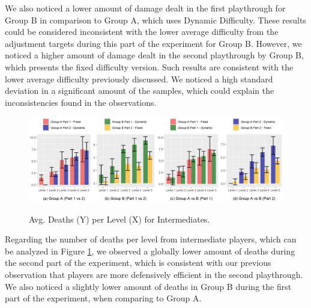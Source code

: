 We also noticed a lower amount of damage dealt in the first playthrough for Group B in comparison to Group A, which uses Dynamic Difficulty. These results could be considered inconsistent with the lower average difficulty from the adjustment targets during this part of the experiment for Group B. However, we noticed a higher amount of damage dealt in the second playthrough by Group B, which presents the fixed difficulty version. Such results are consistent with the lower average difficulty previously discussed. We noticed a high standard deviation in a significant amount of the samples, which could explain the inconsistencies found in the observations.

\begin{figure}[!ht]
    \begin{center}
    \caption{Avg. Deaths (Y) per Level (X) for Intermediates.}
        \includegraphics[width=\textwidth]{figures/deaths_per_level-intermediate_players.png}
        \label{fig:result-metric-intermediates-deaths-per-level}
    \end{center}
\end{figure}

Regarding the number of deaths per level from intermediate players, which can be analyzed in Figure \ref{fig:result-metric-intermediates-deaths-per-level}, we observed a globally lower amount of deaths during the second part of the experiment, which is consistent with our previous observation that players are more defensively efficient in the second playthrough. We also noticed a slightly lower amount of deaths in Group B during the first part of the experiment, when comparing to Group A.

